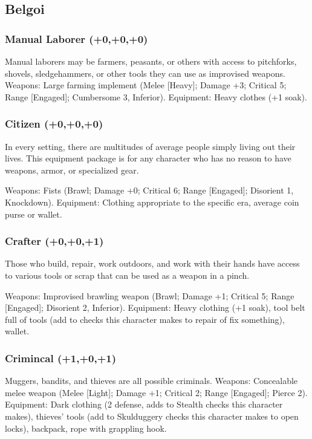 \subsection{Belgoi}

\subsubsection{Manual Laborer (+0,+0,+0)}

Manual laborers may be farmers, peasants, or others
with access to pitchforks, shovels, sledgehammers, or
other tools they can use as improvised weapons.
Weapons: Large farming implement (Melee [Heavy];
Damage +3; Critical 5; Range [Engaged]; Cumbersome
3, Inferior).
Equipment: Heavy clothes (+1 soak).

\subsubsection{Citizen (+0,+0,+0)}
In every setting, there are multitudes of average people
simply living out their lives. This equipment package is
for any character who has no reason to have weapons,
armor, or specialized gear.

Weapons: Fists (Brawl; Damage +0; Critical 6; Range
[Engaged]; Disorient 1, Knockdown).
Equipment: Clothing appropriate to the specific era,
average coin purse or wallet.

\subsubsection{Crafter (+0,+0,+1)}
Those who build, repair, work outdoors, and work with
their hands have access to various tools or scrap that
can be used as a weapon in a pinch.

Weapons: Improvised brawling weapon (Brawl; Damage
+1; Critical 5; Range [Engaged]; Disorient 2, Inferior).
Equipment: Heavy clothing (+1 soak), tool belt full of
tools (add to checks this character makes to repair of
fix something), wallet.

\subsubsection{Crimincal (+1,+0,+1)}
Muggers, bandits, and thieves are all possible criminals.
Weapons: Concealable melee weapon (Melee [Light];
Damage +1; Critical 2; Range [Engaged]; Pierce 2).
Equipment: Dark clothing (2 defense, adds \boost to
Stealth checks this character makes), thieves’ tools (add
\advantage to Skulduggery checks this character makes to open
locks), backpack, rope with grappling hook.

